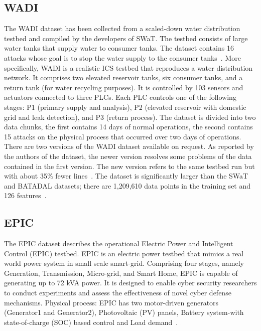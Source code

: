 \documentclass[english,12pt]{article}
\begin{document}
\subsection{WADI} \label{WADI}

The WADI dataset has been collected from a scaled-down water distribution testbed and compiled by the developers of
SWaT. The testbed consists of large water tanks that supply water to consumer tanks. The dataset contains 16 attacks
whose goal is to stop the water supply to the consumer tanks~\cite{DBLP:journals/corr/abs-1907-01216}. More specifically, WADI is a realistic ICS testbed
that reproduces a water distribution network. It comprises two elevated reservoir tanks, six consumer tanks, and a
return tank (for water recycling purposes). It is controlled by 103 sensors and actuators connected to three PLCs.
Each PLC controls one of the following stages: P1 (primary supply and analysis), P2 (elevated reservoir with domestic
grid and leak detection), and P3 (return process). The dataset is divided into two data chunks, the first contains 14
days of normal operations, the second contains 15 attacks on the physical process that occurred over two days of
operations. There are two versions of the WADI dataset available on request. As reported by the authors of the dataset,
the newer version resolves some problems of the data contained in the first version. The new version refers to the same
testbed run but with about 35\% fewer lines~\cite{DBLP:conf/ccs/TurrinETC20}. The dataset is significantly larger than the SWaT and BATADAL
datasets; there are 1,209,610 data points in the training set and 126 features~\cite{DBLP:journals/corr/abs-1907-01216}.

\subsection{EPIC} \label{EPIC}

The EPIC dataset describes the operational Electric Power and Intelligent Control (EPIC) testbed. 
EPIC is an electric power testbed that mimics a real world power system in small scale smart-grid. Comprising
four stages, namely Generation, Transmission, Micro-grid, and Smart Home, EPIC is capable of generating up to 72 kVA power.
It is designed to enable cyber security researchers to conduct experiments and assess the effectiveness of novel cyber
defense mechanisms. Physical process: EPIC has two motor-driven generators (Generator1 and Generator2), Photovoltaic (PV)
panels, Battery system-with state-of-charge (SOC) based control and Load demand~\cite{iTrust}.\\
\end{document}
